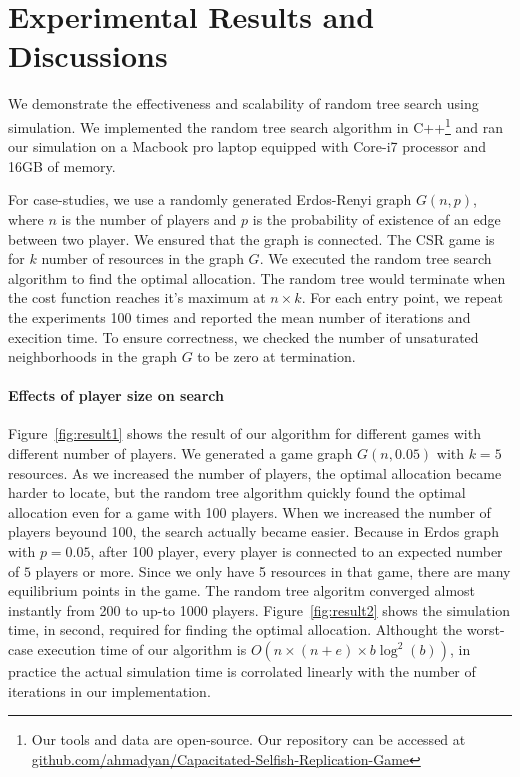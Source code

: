 \section{Experimental Results and Discussions}\label{sec:results}
We demonstrate the effectiveness and scalability of random tree search using simulation.
We implemented the random tree search algorithm in C++\footnote{Our tools and data are open-source. Our repository can be accessed at \url{github.com/ahmadyan/Capacitated-Selfish-Replication-Game}} and ran our simulation on a Macbook pro laptop equipped with Core-i7 processor and 16GB of memory.

For case-studies, we use a randomly generated Erdos-Renyi graph $G(n,p)$, where $n$ is the number of players and $p$ is the probability of existence of an edge between two player. We ensured that the graph is connected. The CSR game is for $k$ number of resources in the graph $G$. We executed the random tree search algorithm to find the optimal allocation. The random tree would terminate when the cost function reaches it's maximum at $n\times k$. For each entry point, we repeat the experiments 100 times and reported the mean number of iterations and execition time. To ensure correctness, we checked the number of unsaturated neighborhoods in the graph $G$ to be zero at termination.



\paragraph{Effects of player size on search}
Figure~\ref{fig:result1} shows the result of our algorithm for different games with different number of players. We generated a game graph $G(n, 0.05)$ with $k=5$ resources. As we increased the number of players, the optimal allocation became harder to locate, but the random tree algorithm quickly found the optimal allocation even for a game with 100 players. When we increased the number of players beyound 100, the search actually became easier. Because in Erdos graph with $p=0.05$, after 100 player, every player is connected to an expected number of $5$ players or more. Since we only have 5 resources in that game, there are many equilibrium points in the game. The random tree algoritm converged almost instantly from 200 to up-to 1000 players. Figure~\ref{fig:result2} shows the simulation time, in second, required for finding the optimal allocation. Althought the worst-case execution time of our algorithm is $O(n\times(n+e)\times b\log^2(b))$, in practice the actual simulation time is corrolated linearly with the number of iterations in our implementation.


